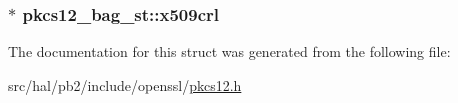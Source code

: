 \subsubsection[{\texorpdfstring{x509crl}{x509crl}}]{$\ast$ pkcs12\+\_\+bag\+\_\+st\+::x509crl}\hypertarget{structpkcs12__bag__st_a64e2e519c49c1a84def0ebd33cb78d4c}{}\label{structpkcs12__bag__st_a64e2e519c49c1a84def0ebd33cb78d4c}


The documentation for this struct was generated from the following file\+:\begin{DoxyCompactItemize}
\item 
src/hal/pb2/include/openssl/\hyperlink{pkcs12_8h}{pkcs12.\+h}\end{DoxyCompactItemize}
